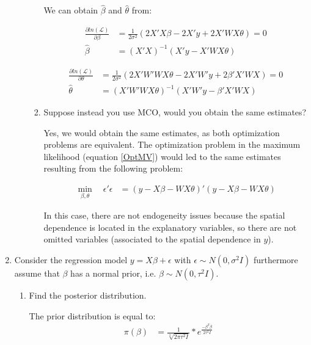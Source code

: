 \documentclass[12pt]{article}
\begin{document}
\begin{enumerate}
\begin{enumerate}
\begin{enumerate}
     We can obtain $\hat{\beta}$ and $\hat{\theta}$ from:
     
     \begin{align*}
         \frac{\partial ln(\mathcal{L})}{\partial \beta} &= \frac{1}{2 \sigma^2}(2X'X\beta - 2 X'y + 2 X'WX\theta) = 0 \\
         \hat{\beta} &= (X'X)^{-1} (X'y - X'WX\theta) 
     \end{align*}
     
     \begin{align*}
         \frac{\partial ln(\mathcal{L})}{\partial \theta} &= \frac{1}{2 \sigma^2} (2X'W'WX\theta - 2 X'W'y + 2 \beta' X' WX) = 0 \\
         \hat{\theta} &= (X'W'W X \theta)^{-1} (X'W'y - \beta' X' W X) 
     \end{align*}
     
      
      \item Suppose instead you use MCO, would you obtain the same estimates? 
      
      Yes, we would obtain the same estimates, as both optimization problems are equivalent. The optimization problem in the maximum likelihood (equation \ref{OptMV}) would led to the same estimates resulting from the following problem:
      
        \begin{align*}
          \min_{\beta, \theta} \quad \epsilon'\epsilon &=  (y- X\beta - W X \theta)' (y- X\beta - W X \theta)
        \end{align*}
      
      In this case, there are not endogeneity issues because the spatial dependence is located in the explanatory variables, so there are not omitted variables (associated to the spatial dependence in $y$).
\\      
  \end{enumerate}  
 \end{enumerate}
 
  \item Consider the regression model $y=X\beta +\epsilon$ with $\epsilon\sim N(0,\sigma^2I)$ furthermore assume that $\beta$ has a normal prior, i.e. $\beta\sim N(0,\tau^2I)$. 
\begin{enumerate}
    \item Find the posterior distribution. 
    
The prior distribution is equal to:
\begin{align*}
\pi(\beta) &= \frac{1}{\sqrt[2]{2\pi\tau^{2}I}} * e^{\frac{-\beta^T\beta}{2\tau^{2}I}}
\end{align*}


\end{enumerate}
\end{enumerate}
\end{document}
